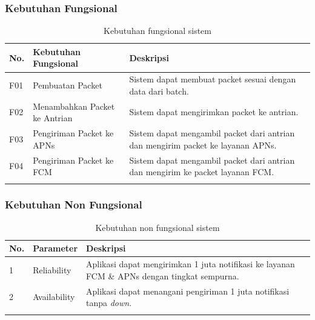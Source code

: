 \subsubsection{Kebutuhan Fungsional}
\begin{longtable}{|p{0.6cm}|p{3cm}|p{4.5cm}|}
    \hline
    \textbf{No.} & \textbf{Kebutuhan Fungsional} & \textbf{Deskripsi} \\ \hline
    F01 & Pembuatan Packet & Sistem dapat membuat packet sesuai dengan data dari batch. \\ \hline
    F02 & Menambahkan Packet ke Antrian & Sistem dapat mengirimkan packet ke antrian. \\ \hline
    F03 & Pengiriman Packet ke APNs & Sistem dapat mengambil packet dari antrian dan mengirim packet ke layanan APNs. \\ \hline
    F04 & Pengiriman Packet ke FCM & Sistem dapat mengambil packet dari antrian dan mengirim ke packet layanan FCM. \\ \hline
    \caption{Kebutuhan fungsional sistem}
\end{longtable}

\subsubsection{Kebutuhan Non Fungsional}
\begin{longtable}{|p{0.5cm}|p{2cm}|p{5.5cm}|}
    \hline
    \textbf{No.} & \textbf{Parameter} & \textbf{Deskripsi} \\ \hline
    1 & Reliability & Aplikasi dapat mengirimkan 1 juta notifikasi ke layanan FCM \& APNs dengan tingkat sempurna. \\ \hline
    2 & Availability & Aplikasi dapat menangani pengiriman 1 juta notifikasi tanpa \textit{down}. \\ \hline
    \caption{Kebutuhan non fungsional sistem}
\end{longtable}

